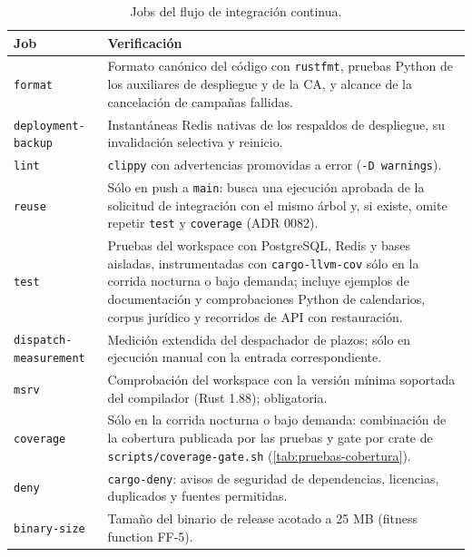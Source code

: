 \begin{table}[H]
  \centering
  \caption{Jobs del flujo de integración continua.}
  \label{tab:matriz-ci}
  \begin{tabularx}{\linewidth}{@{}l X@{}}
    \toprule
    \textbf{Job} & \textbf{Verificación} \\
    \midrule
    \texttt{format} & Formato canónico del código con \texttt{rustfmt}, pruebas Python de los auxiliares de despliegue y de la CA, y alcance de la cancelación de campañas fallidas. \\
    \texttt{deployment-backup} & Instantáneas Redis nativas de los respaldos de despliegue, su invalidación selectiva y reinicio. \\
    \texttt{lint} & \texttt{clippy} con advertencias promovidas a error (\texttt{-D warnings}). \\
    \texttt{reuse} & Sólo en push a \texttt{main}: busca una ejecución aprobada de la solicitud de integración con el mismo árbol y, si existe, omite repetir \texttt{test} y \texttt{coverage} (ADR 0082). \\
    \texttt{test} & Pruebas del workspace con PostgreSQL, Redis y bases aisladas, instrumentadas con \texttt{cargo-llvm-cov} sólo en la corrida nocturna o bajo demanda; incluye ejemplos de documentación y comprobaciones Python de calendarios, corpus jurídico y recorridos de API con restauración. \\
    \texttt{dispatch-measurement} & Medición extendida del despachador de plazos; sólo en ejecución manual con la entrada correspondiente. \\
    \texttt{msrv} & Comprobación del workspace con la versión mínima soportada del compilador (Rust 1.88); obligatoria. \\
    \texttt{coverage} & Sólo en la corrida nocturna o bajo demanda: combinación de la cobertura publicada por las pruebas y gate por crate de \texttt{scripts/coverage-gate.sh} (\cref{tab:pruebas-cobertura}). \\
    \texttt{deny} & \texttt{cargo-deny}: avisos de seguridad de dependencias, licencias, duplicados y fuentes permitidas. \\
    \texttt{binary-size} & Tamaño del binario de release acotado a 25 MB (fitness function FF-5). \\
    \bottomrule
  \end{tabularx}
\end{table}





